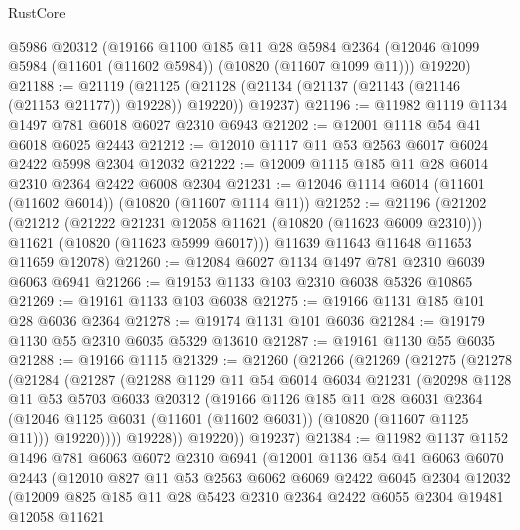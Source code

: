 \begin{lexlean}{RustCore}
\begin{coremodule}
    @5986
    @20312
    (@19166
      @1100
      @185
      @11
      @28
      @5984
      @2364
      (@12046 @1099 @5984 (@11601 (@11602 @5984)) (@10820 (@11607 @1099 @11)))
      @19220)
@21188 := @21119
    (@21125 (@21128 (@21134 (@21137 (@21143 (@21146 (@21153 @21177)) @19228)) @19220)) @19237)
@21196 := @11982 @1119 @1134 @1497 @781 @6018 @6027 @2310 @6943
@21202 := @12001 @1118 @54 @41 @6018 @6025 @2443
@21212 := @12010 @1117 @11 @53 @2563 @6017 @6024 @2422 @5998 @2304 @12032
@21222 := @12009 @1115 @185 @11 @28 @6014 @2310 @2364 @2422 @6008 @2304
@21231 := @12046 @1114 @6014 (@11601 (@11602 @6014)) (@10820 (@11607 @1114 @11))
@21252 := @21196
    (@21202
      (@21212
        (@21222 @21231 @12058 @11621 (@10820 (@11623 @6009 @2310)))
        @11621
        (@10820 (@11623 @5999 @6017)))
      @11639
      @11643
      @11648
      @11653
      @11659
      @12078)
@21260 := @12084 @6027 @1134 @1497 @781 @2310 @6039 @6063 @6941
@21266 := @19153 @1133 @103 @2310 @6038 @5326 @10865
@21269 := @19161 @1133 @103 @6038
@21275 := @19166 @1131 @185 @101 @28 @6036 @2364
@21278 := @19174 @1131 @101 @6036
@21284 := @19179 @1130 @55 @2310 @6035 @5329 @13610
@21287 := @19161 @1130 @55 @6035
@21288 := @19166 @1115
@21329 := @21260
    (@21266
      (@21269
        (@21275
          (@21278
            (@21284
              (@21287
                (@21288
                  @1129
                  @11
                  @54
                  @6014
                  @6034
                  @21231
                  (@20298
                    @1128
                    @11
                    @53
                    @5703
                    @6033
                    @20312
                    (@19166
                      @1126
                      @185
                      @11
                      @28
                      @6031
                      @2364
                      (@12046 @1125 @6031 (@11601 (@11602 @6031)) (@10820 (@11607 @1125 @11)))
                      @19220))))
              @19228))
          @19220))
      @19237)
@21384 := @11982
    @1137
    @1152
    @1496
    @781
    @6063
    @6072
    @2310
    @6941
    (@12001
      @1136
      @54
      @41
      @6063
      @6070
      @2443
      (@12010
        @827
        @11
        @53
        @2563
        @6062
        @6069
        @2422
        @6045
        @2304
        @12032
        (@12009
          @825
          @185
          @11
          @28
          @5423
          @2310
          @2364
          @2422
          @6055
          @2304
          @19481
          @12058
          @11621

\end{coremodule}
\end{lexlean}

